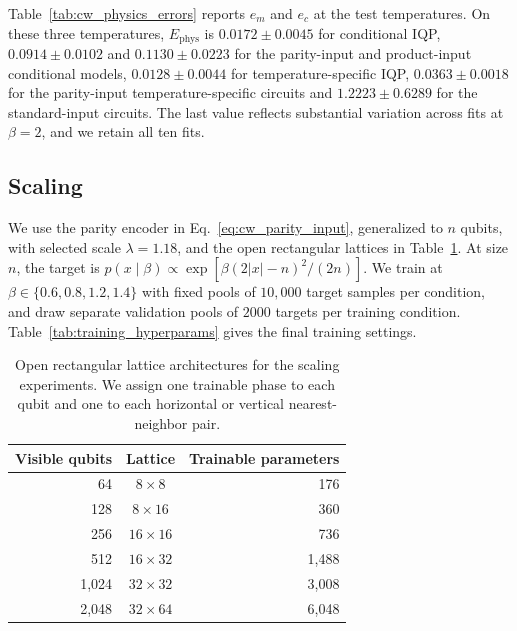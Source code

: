 \documentclass[pra,aps,10pt,twocolumn,floatfix,superscriptaddress, notitlepage,longbibliography]{revtex4-2}
\begin{document}
Table~\ref{tab:cw_physics_errors} reports $e_m$ and $e_c$ at the test temperatures. On these three temperatures, $E_{\mathrm{phys}}$ is $0.0172\pm0.0045$ for conditional IQP, $0.0914\pm0.0102$ and $0.1130\pm0.0223$ for the parity-input and product-input conditional models, $0.0128\pm0.0044$ for temperature-specific IQP, $0.0363\pm0.0018$ for the parity-input temperature-specific circuits and $1.2223\pm0.6289$ for the standard-input circuits. The last value reflects substantial variation across fits at $\beta=2$, and we retain all ten fits.



\subsection{Scaling}
\label{sec:appendix_scaling}

We use the parity encoder in Eq.~\eqref{eq:cw_parity_input}, generalized to $n$ qubits, with selected scale $\lambda=1.18$, and the open rectangular lattices in Table~\ref{tab:scaling_architectures}. At size $n$, the target is $p(x\mid\beta)\propto\exp[\beta(2|x|-n)^2/(2n)]$. We train at $\beta\in\{0.6,0.8,1.2,1.4\}$ with fixed pools of $10{,}000$ target samples per condition, and draw separate validation pools of $2000$ targets per training condition. Table~\ref{tab:training_hyperparams} gives the final training settings.

\begin{table}[!htbp]
\centering
\caption{Open rectangular lattice architectures for the scaling experiments. We assign one trainable phase to each qubit and one to each horizontal or vertical nearest-neighbor pair.}
\label{tab:scaling_architectures}
\small
\begin{tabular}{rcr}
\toprule
Visible qubits & Lattice & Trainable parameters \\
\midrule
64 & $8\times8$ & 176 \\
128 & $8\times16$ & 360 \\
256 & $16\times16$ & 736 \\
512 & $16\times32$ & 1,488 \\
1,024 & $32\times32$ & 3,008 \\
2,048 & $32\times64$ & 6,048 \\
\bottomrule
\end{tabular}
\end{table}
\end{document}
